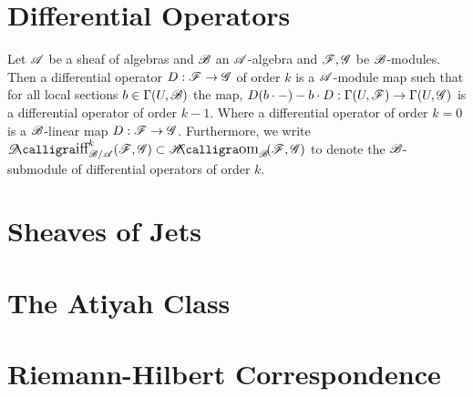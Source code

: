 \documentclass[12pt]{article}
\begin{document}
\section{Differential Operators}

\begin{defn}
Let $\mathscr{A}$ be a sheaf of algebras and $\mathscr{B}$ an $\mathscr{A}$-algebra and $\mathscr{F}, \mathscr{G}$ be $\mathscr{B}$-modules. Then a differential operator $D : \mathscr{F} \to \mathscr{G}$ of order $k$ is a $\mathscr{A}$-module map such that for all local sections $b \in \Gamma(U, \mathscr{B})$ the map, $D(b \cdot -) - b \cdot D : \Gamma(U, \mathscr{F}) \to \Gamma(U, \mathscr{G})$ is a differential operator of order $k - 1$. Where a differential operator of order $k = 0$ is a $\mathscr{B}$-linear map $D : \mathscr{F} \to \mathscr{G}$. Furthermore, we write $\shDiff{k}{\sB/\sA}{\F}{\G} \subset \shHom{\sB}{\F}{\G}$ to denote the $\mathscr{B}$-submodule of differential operators of order $k$.
\end{defn}

\section{Sheaves of Jets}

\section{The Atiyah Class}

\section{Riemann-Hilbert Correspondence}
\end{document}
